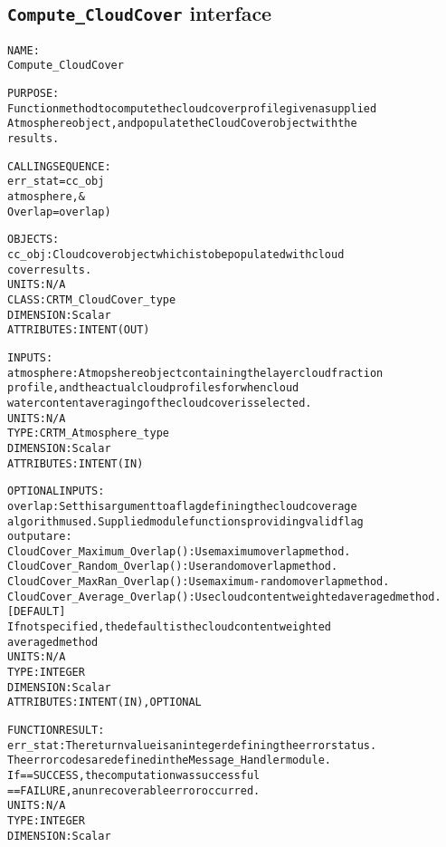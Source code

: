 \subsection{\texttt{Compute\_CloudCover} interface}
  \label{sec:Compute_CloudCover_interface}
  \begin{alltt}
 
  NAME:
    Compute_CloudCover
 
  PURPOSE:
    Function method to compute the cloud cover profile given a supplied
    Atmosphere object, and populate the CloudCover object with the
    results.
 
  CALLING SEQUENCE:
    err_stat = cc_obj%Compute_CloudCover( &
                 atmosphere       , &
                 Overlap = overlap  )
 
  OBJECTS:
    cc_obj:      Cloud cover object which is to be populated with cloud
                 cover results.
                 UNITS:      N/A
                 CLASS:      CRTM_CloudCover_type
                 DIMENSION:  Scalar
                 ATTRIBUTES: INTENT(OUT)
 
  INPUTS:
    atmosphere:  Atmopshere object containing the layer cloud fraction
                 profile, and the actual cloud profiles for when cloud
                 water content averaging of the cloud cover is selected.
                 UNITS:      N/A
                 TYPE:       CRTM_Atmosphere_type
                 DIMENSION:  Scalar
                 ATTRIBUTES: INTENT(IN)
 
  OPTIONAL INPUTS:
    overlap:     Set this argument to a flag defining the cloud coverage
                 algorithm used. Supplied module functions providing valid flag
                 output are:
                   CloudCover_Maximum_Overlap(): Use maximum overlap method.
                   CloudCover_Random_Overlap() : Use random overlap method.
                   CloudCover_MaxRan_Overlap() : Use maximum-random overlap method.
                   CloudCover_Average_Overlap(): Use cloud content weighted averaged method. [DEFAULT]
                 If not specified, the default is the cloud content weighted
                 averaged method
                 UNITS:      N/A
                 TYPE:       INTEGER
                 DIMENSION:  Scalar
                 ATTRIBUTES: INTENT(IN), OPTIONAL
 
  FUNCTION RESULT:
    err_stat:    The return value is an integer defining the error status.
                 The error codes are defined in the Message_Handler module.
                   If == SUCCESS, the computation was successful
                      == FAILURE, an unrecoverable error occurred.
                 UNITS:      N/A
                 TYPE:       INTEGER
                 DIMENSION:  Scalar
 
  \end{alltt}
